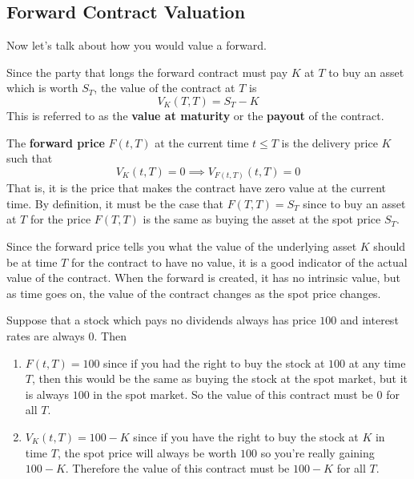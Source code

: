 \documentclass{article}
\begin{document}
  \subsection{Forward Contract Valuation}

    Now let's talk about how you would value a forward. 

    \begin{definition}
      Since the party that longs the forward contract must pay $K$ at $T$ to buy an asset which is worth $S_T$, the value of the contract at $T$ is 
      \begin{equation}
        V_K (T, T) = S_T - K
      \end{equation}
      This is referred to as the \textbf{value at maturity} or the \textbf{payout} of the contract.
    \end{definition}

    \begin{definition}
      The \textbf{forward price} $F(t, T)$ at the current time $t \leq T$ is the delivery price $K$ such that 
      \begin{equation}
        V_K (t, T) = 0 \implies V_{F(t, T)} (t, T) = 0 
      \end{equation}
      That is, it is the price that makes the contract have zero value at the current time. By definition, it must be the case that $F(T, T) = S_T$ since to buy an asset at $T$ for the price $F(T, T)$ is the same as buying the asset at the spot price $S_T$. 
    \end{definition}

    Since the forward price tells you what the value of the underlying asset $K$ should be at time $T$ for the contract to have no value, it is a good indicator of the actual value of the contract. When the forward is created, it has no intrinsic value, but as time goes on, the value of the contract changes as the spot price changes.

    \begin{example}
      Suppose that a stock which pays no dividends always has price $100$ and interest rates are always $0$. Then 
      \begin{enumerate}
        \item $F(t, T) = 100$ since if you had the right to buy the stock at $100$ at any time $T$, then this would be the same as buying the stock at the spot market, but it is always $100$ in the spot market. So the value of this contract must be $0$ for all $T$. 
        \item $V_K (t, T) = 100 - K$ since if you have the right to buy the stock at $K$ in time $T$, the spot price will always be worth $100$ so you're really gaining $100 - K$. Therefore the value of this contract must be $100 - K$ for all $T$. 
      \end{enumerate}
    \end{example}
\end{document}
